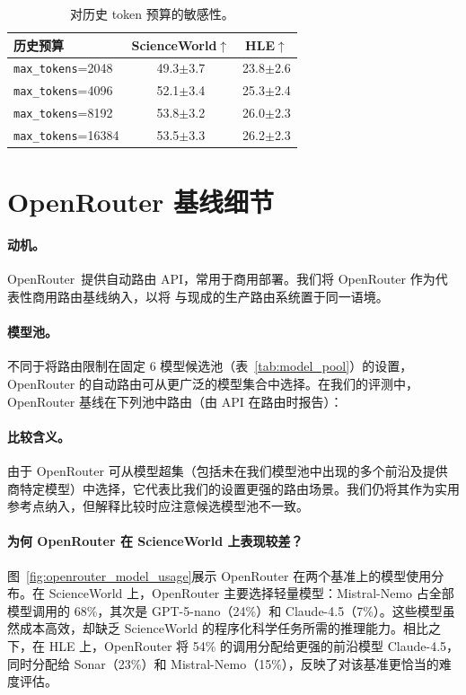 \begin{table}[!htbp]
\centering
\small
\setlength{\tabcolsep}{6pt}
\begin{tabular}{lcc}
\toprule
历史预算 & ScienceWorld$\uparrow$ & HLE$\uparrow$ \\
\midrule
\texttt{max\_tokens}=2048  & 49.3$\pm$3.7 & 23.8$\pm$2.6 \\
\texttt{max\_tokens}=4096  & 52.1$\pm$3.4 & 25.3$\pm$2.4 \\
\texttt{max\_tokens}=8192  & 53.8$\pm$3.2 & 26.0$\pm$2.3 \\
\texttt{max\_tokens}=16384 & 53.5$\pm$3.3 & 26.2$\pm$2.3 \\
\bottomrule
\end{tabular}
\caption{对历史 token 预算的敏感性。}
\label{tab:history_budget}
\end{table}

\section{OpenRouter 基线细节}
\label{app:openrouter}

\paragraph{动机。}
OpenRouter~\citep{openrouter}提供自动路由 API，常用于商用部署。我们将 OpenRouter 作为代表性商用路由基线纳入，以将 \method 与现成的生产路由系统置于同一语境。

\paragraph{模型池。}
不同于将路由限制在固定 6 模型候选池（表~\ref{tab:model_pool}）的设置，OpenRouter 的自动路由可从更广泛的模型集合中选择。在我们的评测中，OpenRouter 基线在下列池中路由（由 API 在路由时报告）：



\paragraph{比较含义。}
由于 OpenRouter 可从模型超集（包括未在我们模型池中出现的多个前沿及提供商特定模型）中选择，它代表比我们的设置更强的路由场景。我们仍将其作为实用参考点纳入，但解释比较时应注意候选模型池不一致。

\paragraph{为何 OpenRouter 在 ScienceWorld 上表现较差？}
图~\ref{fig:openrouter_model_usage}展示 OpenRouter 在两个基准上的模型使用分布。在 ScienceWorld 上，OpenRouter 主要选择轻量模型：Mistral-Nemo 占全部模型调用的 68\%，其次是 GPT-5-nano（24\%）和 Claude-4.5（7\%）。这些模型虽然成本高效，却缺乏 ScienceWorld 的程序化科学任务所需的推理能力。相比之下，在 HLE 上，OpenRouter 将 54\% 的调用分配给更强的前沿模型 Claude-4.5，同时分配给 Sonar（23\%）和 Mistral-Nemo（15\%），反映了对该基准更恰当的难度评估。

